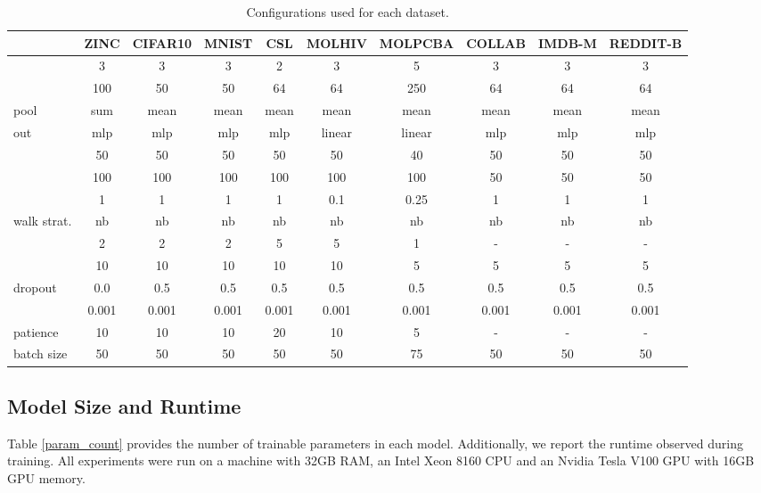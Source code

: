 \documentclass{scrartcl} \usepackage[dvipsnames]{xcolor}
\begin{document}
\begin{table*}[t]
\caption{Configurations used for each dataset.}
\label{hyper_param}
\begin{center}
\begin{tiny}
\begin{tabular}{l|c|c|c|c|c|c|c|c|c}
\toprule
 & ZINC & CIFAR10 & MNIST & CSL & MOLHIV & MOLPCBA & COLLAB & IMDB-M & REDDIT-B \\
\midrule
 & 3 & 3 & 3 & 2 & 3 & 5 & 3 & 3 & 3 \\
 & 100 & 50 & 50 & 64 & 64 & 250 & 64 & 64 & 64 \\
pool & sum & mean & mean & mean & mean & mean & mean & mean & mean \\
out & mlp & mlp & mlp & mlp & linear & linear & mlp & mlp & mlp \\
  & 50 & 50 & 50 & 50 & 50 & 40 & 50 & 50 & 50 \\
  & 100 & 100 & 100 & 100 & 100 & 100 & 50 & 50 & 50 \\
 & 1 & 1 & 1 & 1 & 0.1 & 0.25 & 1 & 1 & 1 \\
walk strat.\! & nb & nb & nb & nb & nb & nb & nb & nb & nb \\
 & 2 & 2 & 2 & 5 & 5 & 1 & - & - & - \\
 & 10 & 10 & 10 & 10 & 10 & 5 & 5 & 5 & 5 \\
dropout & 0.0 & 0.5 & 0.5 & 0.5 & 0.5 & 0.5 & 0.5 & 0.5 & 0.5 \\
 & 0.001 & 0.001 & 0.001 & 0.001 & 0.001 & 0.001 & 0.001 & 0.001 & 0.001 \\
patience & 10 & 10 & 10 & 20 & 10 & 5 & - & - & - \\
batch size & 50 & 50 & 50 & 50 & 50 & 75 & 50 & 50 & 50 \\
\bottomrule
\end{tabular}
\end{tiny}
\end{center}
\vskip -0.1in
\end{table*}


\subsection{Model Size and Runtime}
Table \ref{param_count} provides the number of trainable parameters in each model.
Additionally, we report the runtime observed during training.
All experiments were run on a machine with 32GB RAM, an Intel Xeon 8160 CPU and an Nvidia Tesla V100 GPU with 16GB GPU memory.
\end{document}
